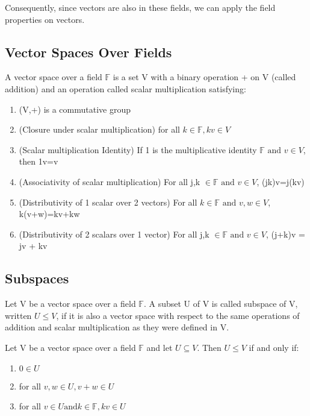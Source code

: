 \documentclass{article}
\begin{document}
Consequently, since vectors are also in these fields, we can apply the field
properties on vectors.

\subsection{Vector Spaces Over Fields}

\begin{definition}
    A vector space over a field $\mathbb{F}$ is a set V with a binary operation +
    on V (called addition) and an operation called scalar multiplication satisfying:
    \begin{enumerate}
	\item (V,+) is a commutative group
	\item (Closure under scalar multiplication) for all $ k \in \mathbb{F},
	    kv \in V$
	\item (Scalar multiplication Identity) If 1 is the multiplicative identity
	    $\mathbb{F} \text{ and } v \in V$, then 1v=v
	\item (Associativity of scalar multiplication) For all j,k $\in \mathbb{F}
	    \text{ and } v \in V$, (jk)v=j(kv)
	\item (Distributivity of 1 scalar over 2 vectors) For all $ k \in \mathbb{F}
	    \text{ and } v,w \in V$, k(v+w)=kv+kw
	\item (Distributivity of 2 scalars over 1 vector) For all j,k $\in
	    \mathbb{F} \text{ and } v \in V$, (j+k)v = jv + kv
    \end{enumerate}
\end{definition}

\subsection{Subspaces}

\begin{definition}[Subspace]
    Let V be a vector space over a field $\mathbb{F}$. A subset U of V is called
    subspace of V, written $ U \leq V$, if it is also a vector space with respect
    to the same operations of addition and scalar multiplication as they were
    defined in V.
\end{definition}

\begin{theorem}
    Let V be a vector space over a field $\mathbb{F}$ and let $ U \subseteq V$.
    Then $ U \leq V$ if and only if:
    \begin{enumerate}
	\item $ 0 \in U$
	\item for all $v,w \in U, v+w \in U$
    \item for all $ v\in U \text{and} k \in \mathbb{F}, kv \in U$
    \end{enumerate}
\end{theorem}
\end{document}
